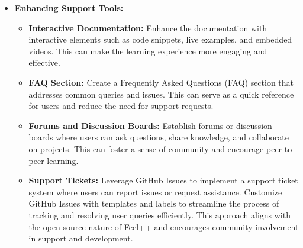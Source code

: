 \begin{itemize}
    \item \textbf{Enhancing Support Tools:}
    \begin{itemize}
        \item \textbf{Interactive Documentation:} Enhance the documentation with interactive elements such as code snippets, live examples, and embedded videos. This can make the learning experience more engaging and effective. 
        \item \textbf{FAQ Section:} Create a Frequently Asked Questions (FAQ) section that addresses common queries and issues. This can serve as a quick reference for users and reduce the need for support requests.
        \item \textbf{Forums and Discussion Boards:} Establish forums or discussion boards where users can ask questions, share knowledge, and collaborate on projects. This can foster a sense of community and encourage peer-to-peer learning.
        \item \textbf{Support Tickets:} Leverage GitHub Issues to implement a support ticket system where users can report issues or request assistance. Customize GitHub Issues with templates and labels to streamline the process of tracking and resolving user queries efficiently. This approach aligns with the open-source nature of Feel++ and encourages community involvement in support and development.
    \end{itemize}


\end{itemize}
